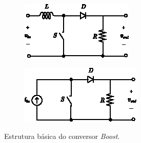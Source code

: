 \begin{figure}[h]
  \centering
  \captionsetup{justification=centering}
  \begin{subfigure}[b]{0.33\textwidth}
    \centering
    \includegraphics[width=\textwidth]{figuras/basic_boost_converter_a.eps}
    \caption{}
    \label{fig:basic_boost_converter_a}
  \end{subfigure}%
  \hfil
  \begin{subfigure}[b]{0.37\textwidth}
    \centering
    \includegraphics[width=\textwidth]{figuras/basic_boost_converter_b.eps}
    \caption{}
    \label{fig:basic_boost_converter_b}
  \end{subfigure}
  \caption{Estrutura básica do conversor \textit{Boost}.}
  \label{fig:boost_converter}
\end{figure}

